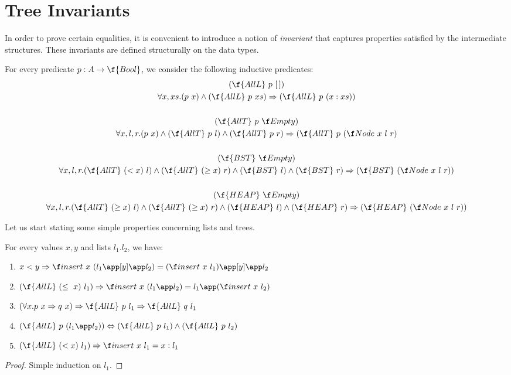 \documentclass[a4paper,11pt]{llncs}
\begin{document}
\newpage
\section{Tree Invariants}
\label{app:sec:tree-invs}


In order to prove certain equalities, it is convenient to introduce a
notion of \emph{invariant} that captures properties satisfied by the
intermediate structures. These invariants are defined structurally on
the data types.

\def\AllL{\f{AllL}}
\def\AllT{\f{AllT}}
\def\Prop{\f{Bool}}
For every predicate $p:A\rightarrow \Prop$, we consider the following
inductive predicates:
\begin{gather*}
  (\AllL\ p\ \Nil) \\
  \forall x, xs . (p\ x) \wedge (\AllL\ p\ xs) \Rightarrow
  (\AllL\ p\ (x:xs)) \\
  \\
  (\AllT\ p\ \Empty) \\
  \forall x, l, r . (p\ x) \wedge (\AllT\ p\ l) \wedge (\AllT\ p\ r)
  \Rightarrow  (\AllT\ p\ (\Node\ x\ l\ r) \\
  \\
  (\f{BST}\ \Empty) \\
  \forall x, l, r . (\AllT\ (< x)\ l) \wedge (\AllT\ (\geq x)\ r)
  \wedge (\f{BST}\ l) \wedge (\f{BST}\ r) \Rightarrow
  (\f{BST}\ (\Node\ x\ l\ r)) \\
  \\
  (\f{HEAP}\ \Empty) \\
  \forall x, l, r . (\AllT\ (\geq x)\ l) \wedge (\AllT\ (\geq x)\ r)
  \wedge (\f{HEAP}\ l) \wedge (\f{HEAP}\ r) \Rightarrow
  (\f{HEAP}\ (\Node\ x\ l\ r))
\end{gather*}


Let us start stating some simple properties concerning lists and trees.

\begin{lemma}
\label{lemma:app-props}
  For every values $x,y$ and lists $l_1.l_2$, we have:
  \begin{enumerate}
  \item $x<y \Rightarrow \insert\ x\ (l_1\app[y]\app l_2) = (\insert\
    x\ l_1)\app[y]\app l_2$
  \item $(\AllL\ (\leq\ x)\ l_1) \Rightarrow \insert\ x\ (l_1\app l_2)
    = l_1\app(\insert\ x\ l_2)$
  \item $(\forall x . p\ x \Rightarrow q\ x) \Rightarrow \AllL\ p\ l_1
    \Rightarrow \AllL\ q\ l_1$
  \item $(\AllL\ p\ (l_1\app l_2)) \Leftrightarrow (\AllL\ p\ l_1) \wedge
    (\AllL\ p\ l_2)$
  \item $(\AllL\ (<x)\ l_1) \Rightarrow \insert\ x\ l_1 = x:l_1$
  \end{enumerate}
\end{lemma}
\begin{proof}
  Simple induction on $l_1$.
\end{proof}
\end{document}
